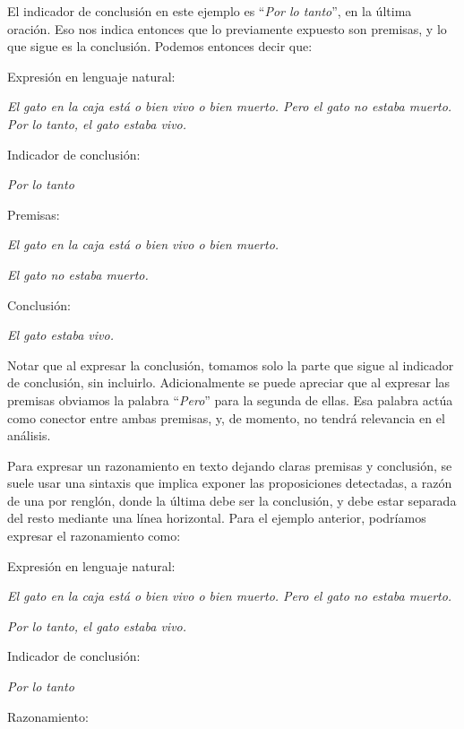 El indicador de conclusión en este ejemplo es ``\textit{Por lo tanto}'', en la
última oración. Eso nos indica entonces que lo previamente expuesto son
premisas, y lo que sigue es la conclusión. Podemos entonces decir que:

\begin{example}
    \sindent Expresión en lenguaje natural:

    \dindent \textit{El gato en la caja está o bien vivo o bien muerto. Pero el
    gato no estaba muerto.} \dindent \textit{Por lo tanto, el gato estaba vivo.}

    \sindent Indicador de conclusión:

    \dindent \textit{Por lo tanto}

    \sindent Premisas:

    \dindent \textit{El gato en la caja está o bien vivo o bien muerto.}

    \dindent \textit{El gato no estaba muerto.}

    \sindent Conclusión:

    \dindent \textit{El gato estaba vivo.}
\end{example}

Notar que al expresar la conclusión, tomamos solo la parte que sigue al
indicador de conclusión, sin incluirlo. Adicionalmente se puede apreciar que al
expresar las premisas obviamos la palabra ``\textit{Pero}'' para la segunda de
ellas. Esa palabra actúa como conector entre ambas premisas, y, de momento, no
tendrá relevancia en el análisis.

Para expresar un razonamiento en texto dejando claras premisas y conclusión, se
suele usar una sintaxis que implica exponer las proposiciones detectadas, a
razón de una por renglón, donde la última debe ser la conclusión, y debe estar
separada del resto mediante una línea horizontal. Para el ejemplo anterior,
podríamos expresar el razonamiento como:

\begin{example}
    \sindent Expresión en lenguaje natural:

    \dindent \textit{El gato en la caja está o bien vivo o bien muerto. Pero el
    gato no estaba muerto.}

    \dindent \textit{Por lo tanto, el gato estaba vivo.}

    \sindent Indicador de conclusión:

    \dindent \textit{Por lo tanto}

    \sindent Razonamiento:

    \begin{lreasoning}[width=0.6\textwidth,margin=\value{dindentwidth} pt]
         
    \end{lreasoning}
\end{example}

